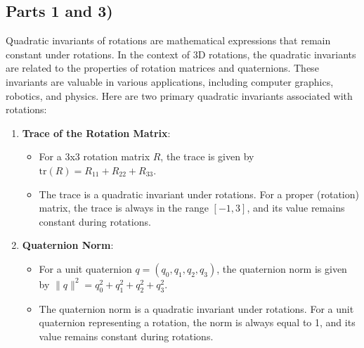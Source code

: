 \documentclass[conference]{IEEEtran}
\begin{document}
\subsection*{Parts 1 and 3)}
Quadratic invariants of rotations are mathematical expressions that remain constant under rotations. In the context of 3D rotations, the quadratic invariants are related to the properties of rotation matrices and quaternions. These invariants are valuable in various applications, including computer graphics, robotics, and physics. Here are two primary quadratic invariants associated with rotations:
\begin{enumerate}
    \item \textbf{Trace of the Rotation Matrix}:
    \begin{itemize}
        \item For a 3x3 rotation matrix \(R\), the trace is given by \(\text{tr}(R) = R_{11} + R_{22} + R_{33}\).
        \item The trace is a quadratic invariant under rotations. For a proper (rotation) matrix, the trace is always in the range \([-1, 3]\), and its value remains constant during rotations.
    \end{itemize}
    \item \textbf{Quaternion Norm}:
    \begin{itemize}
        \item For a unit quaternion \(q = (q_0, q_1, q_2, q_3)\), the quaternion norm is given by \(\|q\|^2 = q_0^2 + q_1^2 + q_2^2 + q_3^2\).
        \item The quaternion norm is a quadratic invariant under rotations. For a unit quaternion representing a rotation, the norm is always equal to 1, and its value remains constant during rotations.
    \end{itemize}
\end{enumerate}
\end{document}
